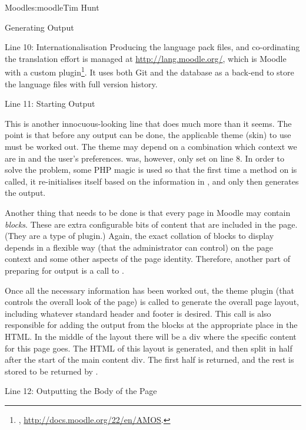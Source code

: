 \begin{aosachapter}{Moodle}{s:moodle}{Tim Hunt}
\begin{aosasect1}{Generating Output}
\begin{aosasect2}{Line 10: Internationalisation}
Producing the language pack files, and co-ordinating the translation
effort is managed at \url{http://lang.moodle.org/}, which is Moodle
with a custom plugin\footnote{,
\url{http://docs.moodle.org/22/en/AMOS}.}. It uses both Git and the
  database as a back-end to store the language files with full version
  history.

\end{aosasect2}

\begin{aosasect2}{Line 11: Starting Output}

This is another innocuous-looking line that does much more than it
seems. The point is that before any output can be done, the applicable
theme (skin) to use must be worked out. The theme may depend on a
combination which context we are in and the user's
preferences.  was, however, only set on line
8. In order to solve the problem, some PHP magic is used so that the
first time a method on  is called, it re-initialises
itself based on the information in , and only then
generates the output.

Another thing that needs to be done is that every page in Moodle may
contain \emph{blocks}. These are extra configurable bits of content
that are included in the page. (They are a type of plugin.) Again, the
exact collation of blocks to display depends in a flexible way (that
the administrator can control) on the page context and some other
aspects of the page identity. Therefore, another part of preparing for
output is a call to
.

Once all the necessary information has been worked out, the theme
plugin (that controls the overall look of the page) is called to
generate the overall page layout, including whatever standard header
and footer is desired. This call is also responsible for adding the
output from the blocks at the appropriate place in the HTML. In the
middle of the layout there will be a div where the specific content
for this page goes. The HTML of this layout is generated, and then
split in half after the start of the main content div. The first half
is returned, and the rest is stored to be returned by
.

\end{aosasect2}

\begin{aosasect2}{Line 12: Outputting the Body of the Page}
 

\end{aosasect2}
\end{aosasect1}
\end{aosachapter}
